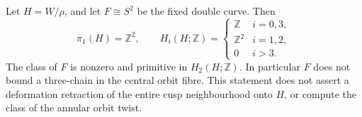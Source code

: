 \begin{proposition}\label{push:src:C.3.7}
Let \(H=W/\rho\), and let \(F\cong S^2\) be the fixed double
curve. Then
\[
 \pi_1(H)=\mathbb Z^2,\qquad
 H_i(H;\mathbb Z)=
 \begin{cases}
 \mathbb Z&i=0,3,\\
 \mathbb Z^2&i=1,2,\\
 0&i>3.
 \end{cases}
\]
The class of \(F\) is nonzero and primitive in \(H_2(H;\mathbb Z)\).
In particular \(F\) does not bound a three-chain in the central
orbit fibre. This statement does not assert a deformation retraction
of the entire cusp neighbourhood onto \(H\), or compute the class
of the annular orbit twist.
\end{proposition}

